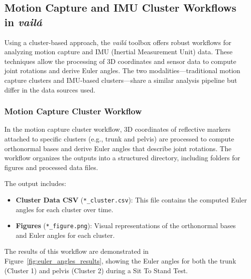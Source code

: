 \documentclass{article}
\begin{document}
\subsection{Motion Capture and IMU Cluster Workflows in \textit{vailá}}

Using a cluster-based approach, the \textit{vailá} toolbox offers robust workflows for analyzing motion capture and IMU (Inertial Measurement Unit) data. These techniques allow the processing of 3D coordinates and sensor data to compute joint rotations and derive Euler angles. The two modalities—traditional motion capture clusters and IMU-based clusters—share a similar analysis pipeline but differ in the data sources used.

\subsubsection{Motion Capture Cluster Workflow}

In the motion capture cluster workflow, 3D coordinates of reflective markers attached to specific clusters (e.g., trunk and pelvis) are processed to compute orthonormal bases and derive Euler angles that describe joint rotations. The workflow organizes the outputs into a structured directory, including folders for figures and processed data files.

The output includes:
\begin{itemize}
    \item \textbf{Cluster Data CSV} (\texttt{*\_cluster.csv}): This file contains the computed Euler angles for each cluster over time.
    \item \textbf{Figures} (\texttt{*\_figure.png}): Visual representations of the orthonormal bases and Euler angles for each cluster.
\end{itemize}

The results of this workflow are demonstrated in Figure~\ref{fig:euler_angles_results}, showing the Euler angles for both the trunk (Cluster 1) and pelvis (Cluster 2) during a Sit To Stand Test.
\end{document}
